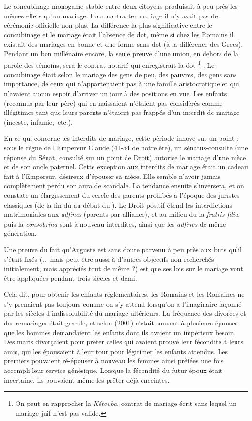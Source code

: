  Le concubinage monogame stable entre deux citoyens produisait à peu près les mêmes effets qu'un mariage. Pour contracter mariage il n'y avait pas de cérémonie officielle non plus. La différence la plus significative entre le concubinage et le mariage était l'absence de dot, même si chez les Romains il existait des mariages en bonne et due forme sans dot (à la différence des Grecs). Pendant un bon millénaire encore, la seule preuve d'une union, en dehors de la parole des témoins, sera le contrat notarié qui enregistrait la dot%
\footnote{On peut en rapprocher la \emph{Kétouba}, contrat de mariage écrit sans lequel un mariage juif n'est pas valide.}%
. Le concubinage était selon  le mariage des gens de peu, des pauvres, des gens sans importance, de ceux qui n'appartenaient pas à une famille aristocratique et qui n'avaient aucun espoir d'arriver un jour à des positions en vue. Les enfants (reconnus par leur père) qui en naissaient n'étaient pas considérés comme illégitimes tant que leurs parents n'étaient pas frappés d'un interdit de mariage (inceste, infamie,~etc.). 

 En ce qui concerne les interdits de mariage, cette période innove sur un point : sous le règne de l'Empereur Claude (41-54 de notre ère), un sénatus-consulte (une réponse du Sénat, consulté sur un point de Droit) autorise le mariage d'une nièce et de son oncle paternel. Cette exception aux interdits de mariage était un cadeau fait à l'Empereur, désireux d'épouser sa nièce. Elle semble n'avoir jamais complètement perdu son aura de scandale. La tendance ensuite s'inversera, et on constate un élargissement du cercle des parents prohibés à l'époque des juristes classiques (de la fin du  au début du ). Le Droit positif étend les interdictions matrimoniales aux \emph{adfines} (parents par alliance), et au milieu du  la \emph{fratris filia}, puis la \emph{consobrina} sont à nouveau interdites, ainsi que les \emph{adfines} de même génération.

 Une preuve du fait qu'Auguste est sans doute parvenu à peu près aux buts qu'il s'était fixés (... mais peut-être aussi à d'autres objectifs non recherchés initialement, mais appréciés tout de même ?) est que ses lois sur le mariage vont être appliquées pendant trois siècles et demi. 

 Cela dit, pour obtenir les enfants réglementaires, les Romains et les Romaines ne s'y prenaient pas toujours comme on s'y attend lorsqu'on a l'imaginaire façonné par les siècles d'indissolubilité du mariage ultérieurs. La fréquence des divorces et des remariages était grande, et selon  (2001) c'était souvent à plusieurs épouses que les hommes demandaient les enfants dont ils avaient un impérieux besoin. Des maris divorçaient pour prêter celles qui avaient prouvé leur fécondité à leurs amis, qui les épousaient à leur tour pour légitimer les enfants attendus. Les premiers pouvaient ré-épouser à nouveau les femmes ainsi prêtées une fois accompli leur service génésique. Lorsque la fécondité du futur époux était incertaine, ils pouvaient même les prêter déjà enceintes. 


